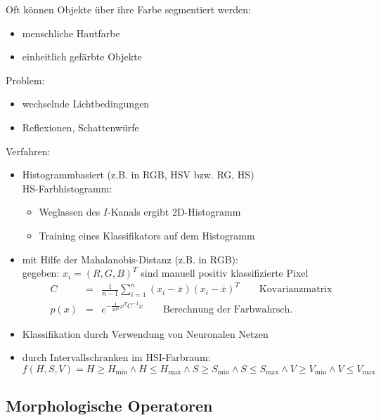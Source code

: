 Oft können Objekte über ihre Farbe segmentiert werden:
\begin{itemize}
\item menschliche Hautfarbe
\item einheitlich gefärbte Objekte
\end{itemize}
Problem:
\begin{itemize}
\item wechselnde Lichtbedingungen
\item Reflexionen, Schattenwürfe
\end{itemize}
Verfahren:
\begin{itemize}
\item Histogrammbasiert (z.B. in RGB, HSV bzw. RG, HS) \\ HS-Farbhistogramm:
\begin{itemize}
\item Weglassen des $I$-Kanals ergibt 2D-Histogramm
\item Training eines Klassifikators auf dem Histogramm
\end{itemize}
\item mit Hilfe der Mahalanobis-Distanz (z.B. in RGB): \\ gegeben: $x_i = (R,G,B)^T$ sind manuell positiv klassifizierte Pixel
\begin{eqnarray*}
C &=& \frac{1}{n-1} \sum\limits_{i=1}^n (x_i - \overline{x})(x_i - \overline{x})^T \qquad \textrm{Kovarianzmatrix} \\ p(x) &=& e^{- \frac{1}{2 \sigma^2} x^T C^{-1} x} \qquad \textrm{Berechnung der Farbwahrsch.}
\end{eqnarray*}
\item Klassifikation durch Verwendung von Neuronalen Netzen
\item durch Intervallschranken im HSI-Farbraum:
$$f(H,S,V) = H \geq H_{\min} \wedge H \leq H_{\max} \wedge S \geq S_{\min} \wedge S \leq S_{\max} \wedge V \geq V_{\min} \wedge V \leq V_{\max}$$
\end{itemize}

\subsection{Morphologische Operatoren}

